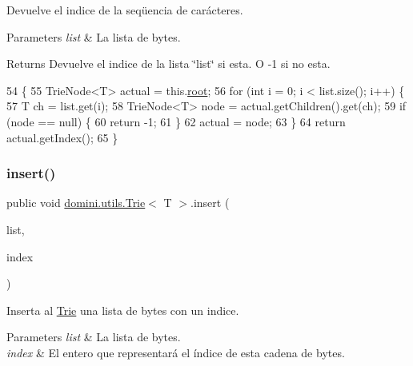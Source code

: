 Devuelve el indice de la seqüencia de carácteres. 


\begin{DoxyParams}{Parameters}
{\em list} & La lista de bytes. \\
\hline
\end{DoxyParams}
\begin{DoxyReturn}{Returns}
Devuelve el indice de la lista \char`\"{}list\char`\"{} si esta. O -\/1 si no esta. 
\end{DoxyReturn}

\begin{DoxyCode}
54                                                 \{
55         TrieNode<T> actual = this.\hyperlink{classdomini_1_1utils_1_1Trie_a60ef63a6c55d07710d33892ccc899bce}{root};
56         \textcolor{keywordflow}{for} (\textcolor{keywordtype}{int} i = 0; i < list.size(); i++) \{
57             T ch = list.get(i);
58             TrieNode<T> node = actual.getChildren().get(ch);
59             \textcolor{keywordflow}{if} (node == null) \{
60                 \textcolor{keywordflow}{return} -1;
61             \}
62             actual = node;
63         \}
64         \textcolor{keywordflow}{return} actual.getIndex();
65     \}
\end{DoxyCode}
\mbox{\label{classdomini_1_1utils_1_1Trie_a3599001d9b056f0b54ab7eabb9d3510b}} 
\subsubsection{\texorpdfstring{insert()}{insert()}}
{\footnotesize\ttfamily public void \hyperlink{classdomini_1_1utils_1_1Trie}{domini.\+utils.\+Trie}$<$ T $>$.insert (\begin{DoxyParamCaption}\item[{Array\+List$<$ T $>$}]{list,  }\item[{Integer}]{index }\end{DoxyParamCaption})\hspace{0.3cm}{\ttfamily [inline]}}



Inserta al \hyperlink{classdomini_1_1utils_1_1Trie}{Trie} una lista de bytes con un indice. 


\begin{DoxyParams}{Parameters}
{\em list} & La lista de bytes. \\
\hline
{\em index} & El entero que representará el índice de esta cadena de bytes. \\
\hline
\end{DoxyParams}

